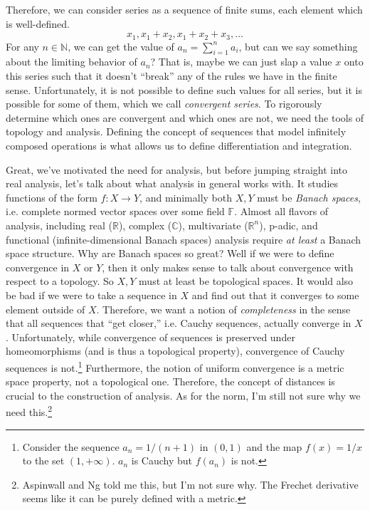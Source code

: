 \documentclass{article}
\begin{document}
  Therefore, we can consider series as a sequence of finite sums, each element which is well-defined. 
  \begin{equation}
    x_1, x_1 + x_2, x_1 + x_2 + x_3, \ldots
  \end{equation} 
  For any $n \in \mathbb{N}$, we can get the value of $a_n = \sum_{i=1}^n a_i$, but can we say something about the limiting behavior of $a_n$? That is, maybe we can just slap a value $x$ onto this series such that it doesn't ``break'' any of the rules we have in the finite sense. Unfortunately, it is not possible to define such values for all series, but it is possible for some of them, which we call \textit{convergent series}. To rigorously determine which ones are convergent and which ones are not, we need the tools of topology and analysis. Defining the concept of sequences that model infinitely composed operations is what allows us to define differentiation and integration. 

  Great, we've motivated the need for analysis, but before jumping straight into real analysis, let's talk about what analysis in general works with. It studies functions of the form $f: X \rightarrow Y$, and minimally both $X, Y$ must be \textit{Banach spaces}, i.e. complete normed vector spaces over some field $\mathbb{F}$. Almost all flavors of analysis, including real ($\mathbb{R}$), complex ($\mathbb{C}$), multivariate ($\mathbb{R}^n$), p-adic, and functional (infinite-dimensional Banach spaces) analysis require \textit{at least} a Banach space structure. Why are Banach spaces so great? Well if we were to define convergence in $X$ or $Y$, then it only makes sense to talk about convergence with respect to a topology. So $X, Y$ must at least be topological spaces. It would also be bad if we were to take a sequence in $X$ and find out that it converges to some element outside of $X$. Therefore, we want a notion of \textit{completeness} in the sense that all sequences that ``get closer,'' i.e. Cauchy sequences, actually converge in $X$. Unfortunately, while convergence of sequences is preserved under homeomorphisms (and is thus a topological property), convergence of Cauchy sequences is not.\footnote{Consider the sequence $a_n = 1/(n+1)$ in $(0, 1)$ and the map $f(x) = 1/x$ to the set $(1, +\infty)$. $a_n$ is Cauchy but $f(a_n)$ is not.} Furthermore, the notion of uniform convergence is a metric space property, not a topological one. Therefore, the concept of distances is crucial to the construction of analysis. As for the norm, I'm still not sure why we need this.\footnote{Aspinwall and Ng told me this, but I'm not sure why. The Frechet derivative seems like it can be purely defined with a metric. } 
\end{document}
